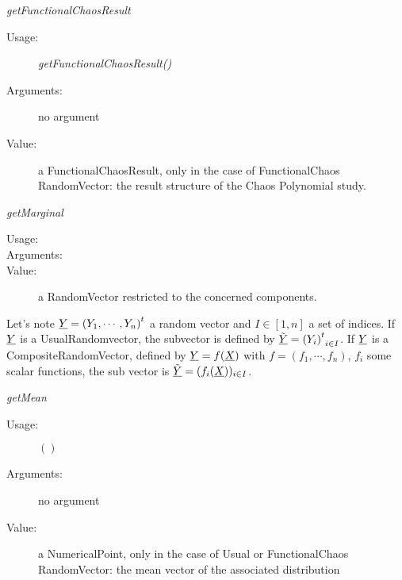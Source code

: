 \begin{description}
\begin{description}
\item \textit{getFunctionalChaosResult}
\begin{description}
\item[Usage:] \textit{getFunctionalChaosResult()}
\item[Arguments:] no argument
\item[Value:] a FunctionalChaosResult, only in the case of FunctionalChaos RandomVector: the  result structure of the Chaos Polynomial study.
\end{description}
\bigskip


\item \textit{getMarginal}
\begin{description}
\item[Usage:] \rule{0pt}{1em}
\item[Arguments:] \rule{0pt}{1em}
\item[Value:] a RandomVector restricted to the concerned components.
\end{description}
\item[Details:] Let's note ${\underline{Y}} = {{(Y_1, \cdots, Y_n)}^t}$ a random vector and $I \in [1, n]$ a set of indices. If ${\underline{Y}}$ is a UsualRandomvector, the subvector is defined by ${\underline{\tilde{Y}}} = {{(Y_i)}^t}_{i \in I}$. If ${\underline{Y}}$ is a CompositeRandomVector, defined by ${\underline{Y}} = f({\underline{X}})$ with $f = (f_1, \cdots, f_n)$, $f_i$ some scalar functions, the sub vector is ${\underline{\tilde{Y}}} = (f_i({\underline{X}}))_{i \in I}$.
\bigskip
\item \textit{getMean}
\begin{description}
\item[Usage:] $()$
\item[Arguments:] no argument
\item[Value:] a NumericalPoint, only in the case of Usual or FunctionalChaos RandomVector: the mean vector of the associated distribution
\end{description}
\bigskip


\end{description}
\end{description}
